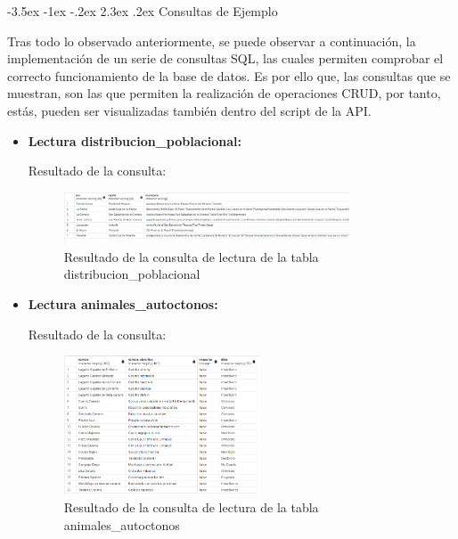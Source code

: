 \documentclass[11pt]{report}
\makeatletter
\renewcommand\chapter{\@startsection{chapter}{0}{\z@}%
    {-3.5ex \@plus -1ex \@minus -.2ex}%
    {2.3ex \@plus.2ex}%
    {\normalfont\Large\bfseries}}
\makeatother
\begin{document}
\newpage

\chapter{Consultas de Ejemplo}

Tras todo lo observado anteriormente, se puede observar a continuación, la implementación de un serie de consultas SQL, las cuales permiten comprobar el correcto funcionamiento de la base de datos. Es por ello que, las consultas que se muestran, son las que permiten la realización de operaciones CRUD, por tanto, estás, pueden ser visualizadas también dentro del script de la API.

\begin{itemize}

      \item \textbf{Lectura distribucion\_poblacional:}
            \lstset{style=mystyle}
            

            Resultado de la consulta:

            \begin{figure}[H]
                  \centering
                  \includegraphics[width=0.8\textwidth]{src/img/read_distribucion_poblacional.png}
                  \caption{Resultado de la consulta de lectura de la tabla distribucion\_poblacional}
                  \label{fig:read_distribucion}
            \end{figure}

      \item \textbf{Lectura animales\_autoctonos:}
            \lstset{style=mystyle}
            

            Resultado de la consulta:

            \begin{figure}[H]
                  \centering
                  \includegraphics[width=0.55\textwidth]{src/img/read_animales_autoctonos.png}
                  \caption{Resultado de la consulta de lectura de la tabla animales\_autoctonos}
                  \label{fig:read_animals}
            \end{figure}


\end{itemize}
\end{document}
